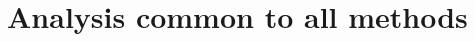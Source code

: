 \documentclass[9pt]{livecoms}
\begin{document}
\section{Analysis common to all methods}

%
%


\clearpage

\renewcommand\bibnumfmt[1]{#1.}


\end{document}
